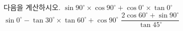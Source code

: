 다음을 계산하시오.
 $\sin 90^\circ\times\cos 90^\circ+\cos 0^\circ\times\tan 0^\circ$
 $\sin 0^\circ-\tan 30^\circ\times\tan 60^\circ+\cos 90^\circ$
 $\dfrac{2\cos 60^\circ+\sin 90^\circ}{\tan 45^\circ}$
